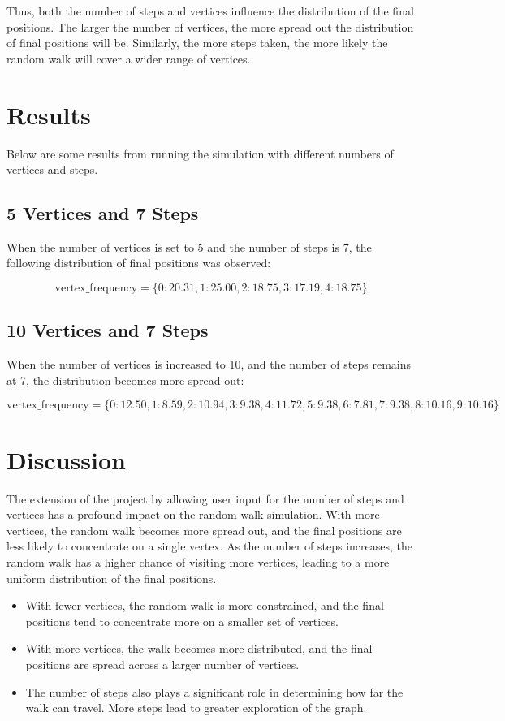 \documentclass[a4paper,12pt]{amsart}
\begin{document}
Thus, both the number of steps and vertices influence the distribution of the final positions. The larger the number of vertices, the more spread out the distribution of final positions will be. Similarly, the more steps taken, the more likely the random walk will cover a wider range of vertices.

\section{Results}
Below are some results from running the simulation with different numbers of vertices and steps.

\subsection{5 Vertices and 7 Steps}
When the number of vertices is set to 5 and the number of steps is 7, the following distribution of final positions was observed:

\[
\text{vertex\_frequency} = \{0: 20.31, 1: 25.00, 2: 18.75, 3: 17.19, 4: 18.75\}
\]

\subsection{10 Vertices and 7 Steps}
When the number of vertices is increased to 10, and the number of steps remains at 7, the distribution becomes more spread out:

\[
\text{vertex\_frequency} = \{0: 12.50, 1: 8.59, 2: 10.94, 3: 9.38, 4: 11.72, 5: 9.38, 6: 7.81, 7: 9.38, 8: 10.16, 9: 10.16\}
\]

\section{Discussion}
The extension of the project by allowing user input for the number of steps and vertices has a profound impact on the random walk simulation. With more vertices, the random walk becomes more spread out, and the final positions are less likely to concentrate on a single vertex. As the number of steps increases, the random walk has a higher chance of visiting more vertices, leading to a more uniform distribution of the final positions.

\begin{itemize}
    \item With fewer vertices, the random walk is more constrained, and the final positions tend to concentrate more on a smaller set of vertices.
    \item With more vertices, the walk becomes more distributed, and the final positions are spread across a larger number of vertices.
    \item The number of steps also plays a significant role in determining how far the walk can travel. More steps lead to greater exploration of the graph.
\end{itemize}
\end{document}
